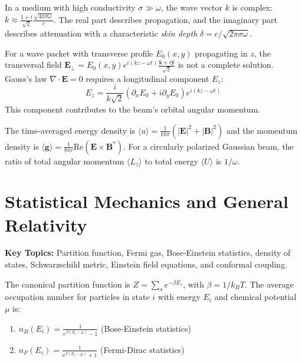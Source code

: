 \begin{theorem}
In a medium with high conductivity $\sigma \gg \omega$, the wave vector $k$ is complex: $k \approx \frac{1+i}{\sqrt{2}} \frac{\sqrt{4\pi \sigma \omega}}{c}$. The real part describes propagation, and the imaginary part describes attenuation with a characteristic \emph{skin depth} $\delta = c/\sqrt{2\pi \sigma \omega}$.
\end{theorem}

\begin{example}
For a wave packet with transverse profile $E_0(x,y)$ propagating in $z$, the transversal field $\mathbf{E}_\perp = E_0(x,y) e^{i(kz-\omega t)} \frac{\hat{\mathbf{x}}+i\hat{\mathbf{y}}}{\sqrt{2}}$ is not a complete solution. Gauss's law $\nabla \cdot \mathbf{E} = 0$ requires a longitudinal component $E_z$:
\[ E_z = \frac{i}{k\sqrt{2}}(\partial_x E_0 + i \partial_y E_0) e^{i(kz-\omega t)} \]
This component contributes to the beam's orbital angular momentum.
\end{example}

\begin{definition}
The time-averaged energy density is $\langle u \rangle = \frac{1}{16\pi}(|\mathbf{E}|^2 + |\mathbf{B}|^2)$ and the momentum density is $\langle \mathbf{g} \rangle = \frac{1}{8\pi c} \text{Re}(\mathbf{E} \times \mathbf{B}^*)$. For a circularly polarized Gaussian beam, the ratio of total angular momentum $\langle L_z \rangle$ to total energy $\langle U \rangle$ is $1/\omega$.
\end{definition}

\section{Statistical Mechanics and General Relativity}

\textbf{Key Topics:} Partition function, Fermi gas, Bose-Einstein statistics, density of states, Schwarzschild metric, Einstein field equations, and conformal coupling.

\begin{definition}
The canonical partition function is $Z = \sum_s e^{-\beta E_s}$, with $\beta = 1/k_B T$. The average occupation number for particles in state $i$ with energy $E_i$ and chemical potential $\mu$ is:
\begin{enumerate}
    \item $n_B(E_i) = \frac{1}{e^{\beta(E_i-\mu)} - 1}$ (Bose-Einstein statistics)
    \item $n_F(E_i) = \frac{1}{e^{\beta(E_i-\mu)} + 1}$ (Fermi-Dirac statistics)
\end{enumerate}
\end{definition}

